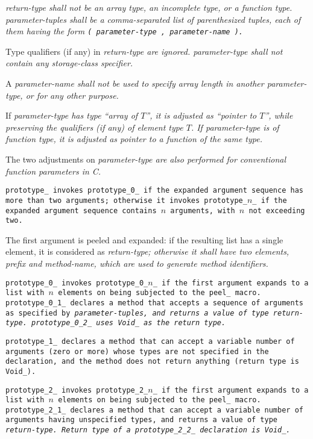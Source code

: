 \pagebreak


\it{return-type} shall not be an array type,
an incomplete type, or a function type.
\it{parameter-tuples} shall be a comma-separated list
of parenthesized tuples, each of them having the form
\tt{(} \it{parameter-type} \tt{,} \it{parameter-name} \tt{)}.

Type qualifiers (if any) in \it{return-type} are ignored.
\it{parameter-type} shall not contain any storage-class specifier.

A \it{parameter-name} shall not be used to specify array length
in another \it{parameter-type}, or for any other purpose.

If \it{parameter-type} has type ``array of $T$'', it is adjusted as ``pointer
to $T$'', while preserving the qualifiers (if any) of element type $T$.
If \it{parameter-type} is of function type, it is
adjusted as pointer to a function of the same type.

\note The two adjustments on \it{parameter-type} are
also performed for conventional function parameters in C.


\tt{prototype_} invokes \tt{prototype_0_} if the expanded argument sequence has
more than two arguments; otherwise it invokes \tt{prototype_}$n$\tt{_} if the
expanded argument sequence contains $n$ arguments, with $n$ not exceeding two.

The first argument is peeled and expanded: if the resulting list
has a single element, it is considered as \it{return-type};
otherwise it shall have two elements, \it{prefix} and
\it{method-name}, which are used to generate method identifiers.

\tt{prototype_0_} invokes \tt{prototype_0_}$n$\_ if the first argument expands
to a list with $n$ elements on being subjected to the \tt{peel_} macro.
\tt{prototype_0_1_} declares a method that accepts a sequence of arguments as
specified by \it{parameter-tuples}, and returns a value of type \it{return-type}.
\tt{prototype_0_2_} uses \tt{Void_} as the return type.

\tt{prototype_1_} declares a method that can accept a variable number of
arguments (zero or more) whose types are not specified in the declaration,
and the method does not return anything (return type is \tt{Void_}).

\tt{prototype_2_} invokes \tt{prototype_2_}$n$\_ if the first argument expands
to a list with $n$ elements on being subjected to the \tt{peel_} macro.
\tt{prototype_2_1_} declares a method that can accept a variable number of
arguments having unspecified types, and returns a value of type \it{return-type}.
Return type of a \tt{prototype_2_2_} declaration is \tt{Void_}.

